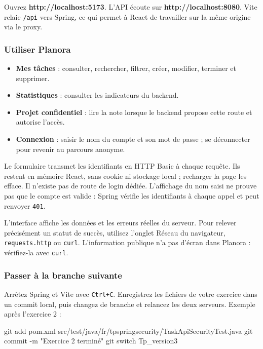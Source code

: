 \documentclass[
  french,
  10pt,
  a4paper,
]{article}
\newenvironment{Shaded}{}{}
\newcommand{\AttributeTok}[1]{\textcolor[rgb]{0.49,0.56,0.16}{#1}}
\newcommand{\FunctionTok}[1]{\textcolor[rgb]{0.02,0.16,0.49}{#1}}
\newcommand{\NormalTok}[1]{#1}
\newcommand{\StringTok}[1]{\textcolor[rgb]{0.25,0.44,0.63}{#1}}
\providecommand{\tightlist}{%
  \setlength{\itemsep}{0pt}\setlength{\parskip}{0pt}}
\begin{document}
Ouvrez \textbf{http://localhost:5173}. L'API écoute sur
\textbf{http://localhost:8080}. Vite relaie \texttt{/api} vers Spring,
ce qui permet à React de travailler sur la même origine via le proxy.

\subsubsection{Utiliser Planora}\label{utiliser-planora}

\begin{itemize}
\tightlist
\item
  \textbf{Mes tâches} : consulter, rechercher, filtrer, créer, modifier,
  terminer et supprimer.
\item
  \textbf{Statistiques} : consulter les indicateurs du backend.
\item
  \textbf{Projet confidentiel} : lire la note lorsque le backend propose
  cette route et autorise l'accès.
\item
  \textbf{Connexion} : saisir le nom du compte et son mot de passe ; se
  déconnecter pour revenir au parcours anonyme.
\end{itemize}

Le formulaire transmet les identifiants en HTTP Basic à chaque requête.
Ils restent en mémoire React, sans cookie ni stockage local ; recharger
la page les efface. Il n'existe pas de route de login dédiée.
L'affichage du nom saisi ne prouve pas que le compte est valide : Spring
vérifie les identifiants à chaque appel et peut renvoyer \texttt{401}.

L'interface affiche les données et les erreurs réelles du serveur. Pour
relever précisément un statut de succès, utilisez l'onglet Réseau du
navigateur, \texttt{requests.http} ou \texttt{curl}. L'information
publique n'a pas d'écran dans Planora : vérifiez-la avec \texttt{curl}.

\subsubsection{Passer à la branche
suivante}\label{passer-uxe0-la-branche-suivante}

Arrêtez Spring et Vite avec \texttt{Ctrl+C}. Enregistrez les fichiers de
votre exercice dans un commit local, puis changez de branche et relancez
les deux serveurs. Exemple après l'exercice 2 :

\begin{Shaded}
\begin{Highlighting}[]
\FunctionTok{git}\NormalTok{ add pom.xml src/test/java/fr/tpspringsecurity/TaskApiSecurityTest.java}
\FunctionTok{git}\NormalTok{ commit }\AttributeTok{{-}m} \StringTok{"Exercice 2 terminé"}
\FunctionTok{git}\NormalTok{ switch Tp\_version3}
\end{Highlighting}
\end{Shaded}
\end{document}
